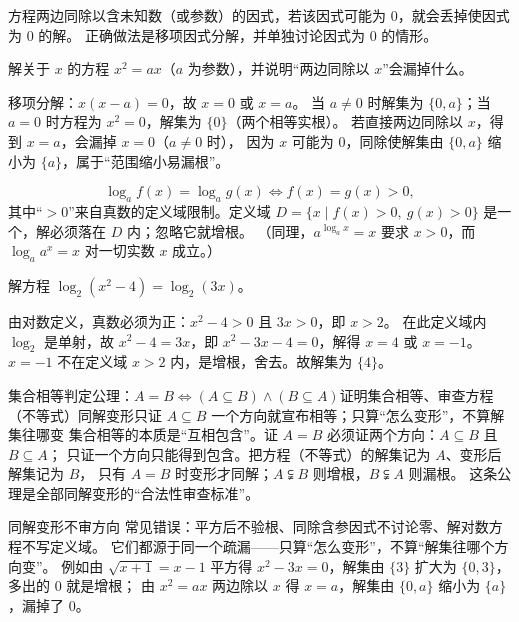 \begin{explore}
方程两边同除以含未知数（或参数）的因式，若该因式可能为 $0$，就会丢掉使因式为 $0$ 的解。
正确做法是移项因式分解，并单独讨论因式为 $0$ 的情形。

\begin{example}
解关于 $x$ 的方程 $x^2=ax$（$a$ 为参数），并说明“两边同除以 $x$”会漏掉什么。
\end{example}
\begin{solution}
移项分解：$x(x-a)=0$，故 $x=0$ 或 $x=a$。
当 $a\neq0$ 时解集为 $\{0,a\}$；当 $a=0$ 时方程为 $x^2=0$，解集为 $\{0\}$（两个相等实根）。
若直接两边同除以 $x$，得到 $x=a$，会漏掉 $x=0$（$a\neq0$ 时），
因为 $x$ 可能为 $0$，同除使解集由 $\{0,a\}$ 缩小为 $\{a\}$，属于“范围缩小易漏根”。
\end{solution}

\[
  \log_a f(x)=\log_a g(x)\iff f(x)=g(x)>0,
\]
其中“$>0$”来自真数的定义域限制。定义域
$D=\{x\mid f(x)>0,\ g(x)>0\}$ 是一个，解必须落在 $D$ 内；忽略它就增根。
（同理，$a^{\log_a x}=x$ 要求 $x>0$，而 $\log_a a^x=x$ 对一切实数 $x$ 成立。）

\begin{example}
解方程 $\log_2(x^2-4)=\log_2(3x)$。
\end{example}
\begin{solution}
由对数定义，真数必须为正：$x^2-4>0$ 且 $3x>0$，即 $x>2$。
在此定义域内 $\log_2$ 是单射，故 $x^2-4=3x$，即 $x^2-3x-4=0$，解得 $x=4$ 或 $x=-1$。
$x=-1$ 不在定义域 $x>2$ 内，是增根，舍去。故解集为 $\{4\}$。
\end{solution}

\begin{conccard}[一级]{集合相等判定公理：$A=B\iff(A\subseteq B)\land(B\subseteq A)$}{证明集合相等、审查方程（不等式）同解变形}{只证 $A\subseteq B$ 一个方向就宣布相等；只算“怎么变形”，不算解集往哪变}
集合相等的本质是“互相包含”。证 $A=B$ 必须证两个方向：$A\subseteq B$ 且 $B\subseteq A$；
只证一个方向只能得到包含。把方程（不等式）的解集记为 $A$、变形后解集记为 $B$，
只有 $A=B$ 时变形才同解；$A\subsetneqq B$ 则增根，$B\subsetneqq A$ 则漏根。
这条公理是全部同解变形的“合法性审查标准”。
\end{conccard}

\begin{commonerror}{同解变形不审方向}
常见错误：平方后不验根、同除含参因式不讨论零、解对数方程不写定义域。
它们都源于同一个疏漏——只算“怎么变形”，不算“解集往哪个方向变”。
例如由 $\sqrt{x+1}=x-1$ 平方得 $x^2-3x=0$，解集由 $\{3\}$ 扩大为 $\{0,3\}$，多出的 $0$ 就是增根；
由 $x^2=ax$ 两边除以 $x$ 得 $x=a$，解集由 $\{0,a\}$ 缩小为 $\{a\}$，漏掉了 $0$。
\end{commonerror}


\end{explore}
